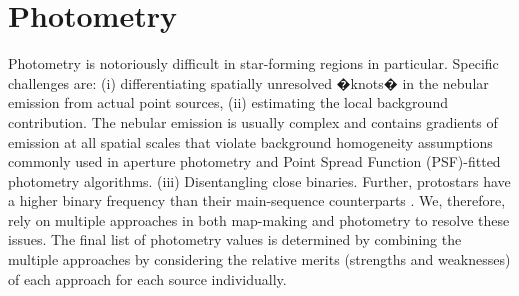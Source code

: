 \documentclass[manuscript]{aastex}
\begin{document}
\section{Photometry}
\label{sec:phot}
\par
Photometry is notoriously difficult in star-forming regions in particular.  Specific challenges are: (i) differentiating spatially unresolved �knots� in the nebular emission from actual point sources, (ii) estimating the local background contribution.  The nebular emission is usually complex and contains gradients of emission at all spatial scales that violate background homogeneity assumptions commonly used in aperture photometry and Point Spread Function (PSF)-fitted photometry algorithms.  (iii) Disentangling close binaries.  Further, protostars have a higher binary frequency than their main-sequence counterparts \citep{binaries}.  We, therefore, rely on multiple approaches in both map-making and photometry to resolve these issues.  The final list of photometry values is determined by combining the multiple approaches by considering the relative merits (strengths and weaknesses) of each approach for each source individually.
\end{document}
